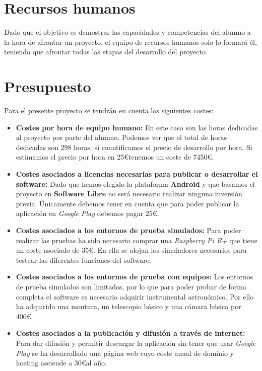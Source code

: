\section{Recursos humanos}

Dado que el objetivo es demostrar las capacidades y competencias del alumno a la hora de afrontar un proyecto, el equipo de recursos humanos solo lo formará él, teniendo que afrontar todas las etapas del desarrollo del proyecto.
\newpage
\section{Presupuesto}

Para el presente proyecto se tendrán en cuenta los siguientes costes:

\begin{itemize}
  \item \textbf{Costes por hora de equipo humano:} En este caso son las horas dedicadas al proyecto por parte del alumno. Podemos ver que el total de horas dedicadas son 298 horas. si cuantificamos el precio de desarrollo por hora. Si estimamos el precio por hora en 25\euro tenemos un coste de 7450\euro.
  \item \textbf{Costes asociados a licencias necesarias para publicar o desarrollar el software:} Dado que hemos elegido la plataforma \textbf{Android} y que basamos el proyecto en \textbf{Software Libre} no será necesario realizar ninguna inversión previa. Únicamente debemos tener en cuenta que para poder publicar la aplicación en \textit{Google Play} debemos pagar 25\euro.
  \item \textbf{Costes asociados a los entornos de prueba simulados:} Para poder realizar las pruebas ha sido necesario comprar una \textit{Raspberry Pi B+} que tiene un coste asociado de 35\euro. En ella se alojan los simuladores necesarios para testear las diferentes funciones del software.
  \item \textbf{Costes asociados a los entornos de prueba con equipos:} Los entornos de prueba simulados son limitados, por lo que para poder probar de forma completa el software es necesario adquirir instrumental astronómico. Por ello ha adquirido una montura, un telescopio básico y una cámara básica por 400\euro.
  \item \textbf{Costes asociados a la publicación y difusión a través de internet:} Para dar difusión y permitir descargar la aplicación sin tener que usar \textit{Google Play} se ha desarrollado una página web cuyo coste anual de dominio y hosting asciende a 30\euro al año.
\end{itemize}

